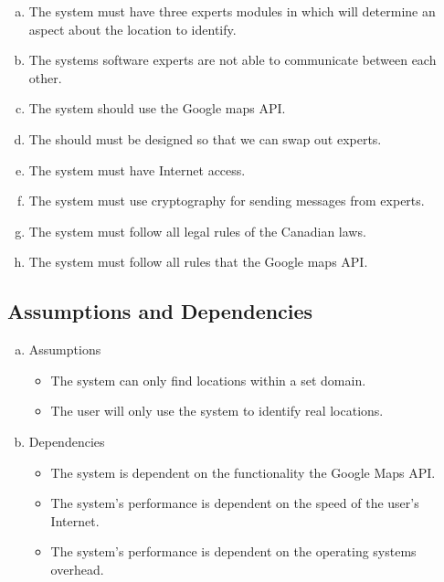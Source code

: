 \documentclass[titlepage]{article}
\begin{document}
		\begin{enumerate}[a)]
			\item The system must have three experts modules in which will determine an aspect about the location to identify.
			\item The systems software experts are not able to communicate between each other.
			\item The system should use the Google maps API.
			\item The should must be designed so that we can swap out experts.
			\item The system must have Internet access.
			\item The system must use cryptography for sending messages from experts.
			\item The system must follow all legal rules of the Canadian laws.
			\item The system must follow all rules that the Google maps API.
			
		\end{enumerate}
		
		\subsection{Assumptions and Dependencies}
		\label{sub:assumptions_and_dependencies}
		\begin{enumerate}[a)]
			\item Assumptions
			\begin{itemize}
				\item The system can only find locations within a set domain.
				\item The user will only use the system to identify real locations.
				
			\end{itemize}
			\item Dependencies
			
			\begin{itemize}
				\item The system is dependent on the functionality the Google Maps API.
				\item The system's performance is dependent on the speed of the user's Internet.
				\item The system's performance is dependent on the operating systems overhead.
				
			\end{itemize}
		\end{enumerate}
		
\end{document}
